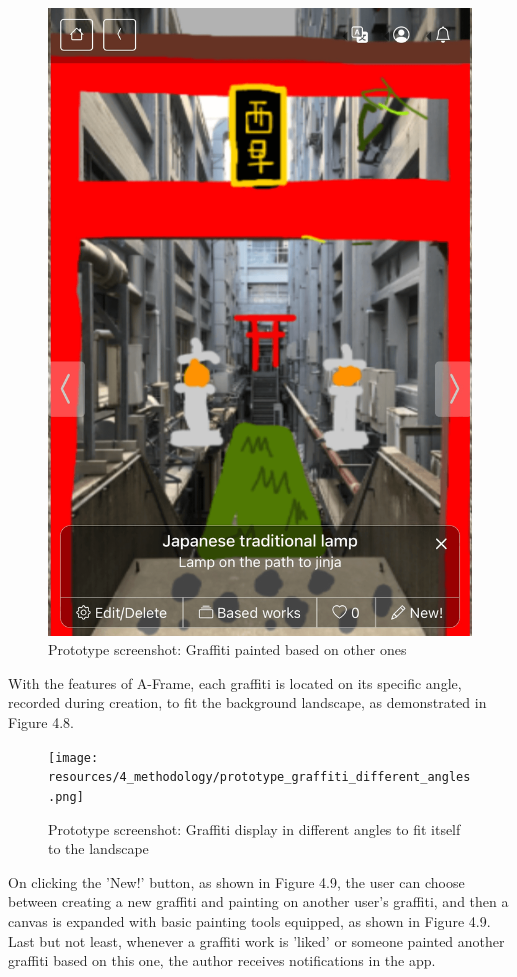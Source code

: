 \begin{figure}
\begin{minipage}{0.48\textwidth}
    \includegraphics[width=0.9\linewidth]{resources/4_methodology/prototype_based_graffiti.png}
      \caption{Prototype screenshot: Graffiti painted based on other ones}
  \end{minipage}
\end{figure}

With the features of A-Frame, each graffiti is located on its specific angle, recorded during creation, to fit the background landscape, as demonstrated in Figure 4.8.

\begin{figure}
  \centering
  \texttt{[image: resources/4\_methodology/prototype\_graffiti\_different\_angles.png]}
    \caption{Prototype screenshot: Graffiti display in different angles to fit itself to the landscape}
\end{figure}

On clicking the 'New!' button, as shown in Figure 4.9, the user can choose between creating a new graffiti and painting on another user's graffiti,
and then a canvas is expanded with basic painting tools equipped, as shown in Figure 4.9.
Last but not least, whenever a graffiti work is 'liked' or someone painted another graffiti based on this one, the author receives notifications in the app.

